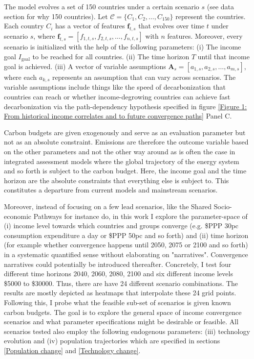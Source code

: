 \documentclass{article}
\begin{document}
The model evolves a set of 150 countries under a certain scenario \( s \) (see data section for why 150 countries). Let \( \mathcal{C} = \{ C_1, C_2, \ldots, C_{150} \} \) represent the countries. Each country \( C_i \) has a vector of features \( \mathbf{f}_{t,s} \) that evolves over time \( t \) under scenario \( s \), where \( \mathbf{f}_{t,s} = [f_{1,t,s}, f_{2,t,s}, \ldots, f_{n,t,s}] \) with \( n \) features. Moreover, every scenario is initialized with the help of the following parameters: (i) The income goal \( I_{\text{goal}} \) to be reached for all countries. (ii) The time horizon \( T \) until that income goal is achieved. (iii) A vector of variable assumptions \( \mathbf{A}_{s} = [a_{1,s}, a_{2,s}, \ldots, a_{m,s}] \), where each \( a_{k,s} \) represents an assumption that can vary across scenarios. The variable assumptions include things like the speed of decarbonization that countries can reach or whether income-degrowing countries can achieve fast decarbonization via the path-dependency hypothesis specified in figure \ref{Figure 1: From historical income correlates and to future convergence paths} Panel C.

Carbon budgets are given exogenously and serve as an evaluation parameter but not as an absolute constraint. Emissions are therefore the outcome variable based on the other parameters and not the other way around as is often the case in integrated assessment models where the global trajectory of the energy system and so forth is subject to the carbon budget. Here, the income goal and the time horizon are the absolute constraints that everything else is subject to. This constitutes a departure from current models and mainstream scenarios.

Moreover, instead of focusing on a few lead scenarios, like the Shared Socio-economic Pathways for instance do, in this work I explore the parameter-space of  (i) income level towards which countries and groups converge (e.g. \$PPP 30pc consumption expenditure a day or \$PPP 50pc and so forth) and (ii) time horizon (for example whether convergence happens until 2050, 2075 or 2100 and so forth) in a systematic quantified sense without  elaborating on "narratives". Convergence narratives could potentially be introduced thereafter. Concretely, I test four different time horizons 2040, 2060, 2080, 2100 and six different income levels \$5000 to \$30000. Thus, there are have 24 different scenario combinations. The results are mostly depicted as heatmaps that interpolate these 24 grid points. Following this, I probe what the feasible sub-set of scenarios is given known carbon budgets. The goal is to explore the general space of income convergence scenarios and what parameter specifications might be desirable or feasible. All scenarios tested also employ the following endogenous parameters: (iii) technology evolution and (iv) population trajectories which are specified in sections \ref{Population change} and 
\ref{Technology change}.
\end{document}
